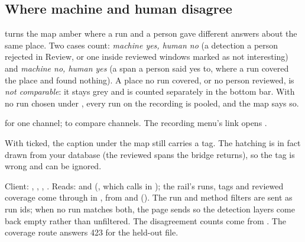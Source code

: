 \subsection{Where machine and human disagree}\label{sec:explore-disagree}
 turns the map amber where a run and a person gave different answers
about the same place. Two cases count: \emph{machine yes, human no} (a detection a person
rejected in Review, or one inside reviewed windows marked as not interesting) and
\emph{machine no, human yes} (a span a person said yes to, where a run covered the place and
found nothing). A place no run covered, or no person reviewed, is \emph{not comparable}: it
stays grey and is counted separately in the bottom bar. With no run chosen under
, every run on the recording is pooled, and the map says so.


 for one channel;  to compare
channels. The recording menu's  link opens
.

\begin{watchout}
With  ticked, the caption under the map still carries a  tag.
The hatching is in fact drawn from your database (the reviewed spans the bridge returns), so
the tag is wrong and can be ignored.
\end{watchout}

\begin{underthehood}[Corpus]
Client: , ,
, . Reads:  and
 (, which calls
 in ); the rail's runs, tags and reviewed
coverage come through  in , from
 and 
(). The run and method filters are sent as run ids; when
no run matches both, the page sends  so the detection layers come back empty
rather than unfiltered. The disagreement counts come from
. The coverage route answers 423 for the held-out file.
\end{underthehood}

